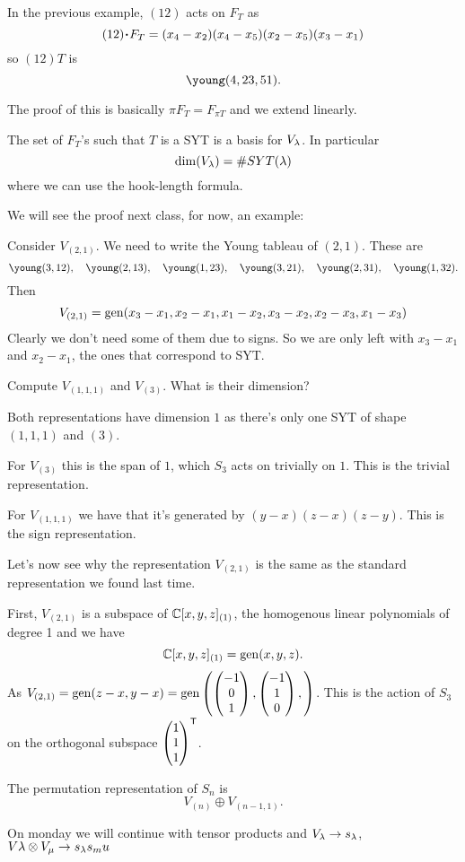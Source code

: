 \documentclass[12pt]{memoir}
\begin{document}
\begin{Ex}
    In the previous example, $(12)$ acts on $F_T$ as 
    $$(12)\.F_T=(x_4-x_2)(x_4-x_5)(x_2-x_5)(x_3-x_1)$$
    so $(12)T$ is 
    $$\young(4,23,51).$$
\end{Ex}

The proof of this is basically $\pi F_T=F_{\pi T}$ and we extend linearly. 

\begin{Prop}
    The set of $F_T$'s such that $T$ is a SYT is a basis for $V_\lambda$. In particular 
    $$\dim(V_\lambda)=\# SYT(\lambda)$$
    where we can use the hook-length formula. 
\end{Prop}

We will see the proof next class, for now, an example:

\begin{Ex}
    Consider $V_{(2,1)}$. We need to write the Young tableau of $(2,1)$. These are 
    $$\young(3,12),\quad\young(2,13),\quad\young(1,23),\quad\young(3,21),\quad\young(2,31),\quad\young(1,32).$$
    Then 
    $$V_{(2,1)}=\operatorname{gen}(x_3-x_1,x_2-x_1,x_1-x_2,x_3-x_2,x_2-x_3,x_1-x_3)$$
    Clearly we don't need some of them due to signs. So we are only left with $x_3-x_1$ and $x_2-x_1$, the ones that correspond to SYT.
\end{Ex}

\begin{Ej}
    Compute $V_{(1,1,1)}$ and $V_{(3)}$. What is their dimension? 
\end{Ej}

\begin{ptcbr}
    Both representations have dimension $1$ as there's only one SYT of shape $(1,1,1)$ and $(3)$.\par 
    For $V_{(3)}$ this is the span of $1$, which $S_3$ acts on trivially on $1$. This is the trivial representation.\par 
    For $V_{(1,1,1)}$ we have that it's generated by $(y-x)(z-x)(z-y)$. This is the sign representation.
\end{ptcbr}

Let's now see why the representation $V_{(2,1)}$ is the same as the standard representation we found last time.\par 
First, $V_{(2,1)}$ is a subspace of $\mathbb{C}[x,y,z]_{(1)}$, the homogenous linear polynomials of degree 1 and we have
$$\mathbb{C}[x,y,z]_{(1)}=\operatorname{gen}(x,y,z).$$
As $V_{(2,1)}=\operatorname{gen}(z-x,y-x)=\operatorname{gen}\left(\begin{pmatrix} -1 \\ 0 \\ 1 \end{pmatrix},\begin{pmatrix} -1 \\ 1 \\ 0 \end{pmatrix},\right)$. This is the action of $S_3$ on the orthogonal subspace $\begin{pmatrix} 1 \\ 1 \\ 1 \end{pmatrix}^{\mathsf{T}}$.

\begin{Lem}
    The permutation representation of $S_n$ is 
    $$V_{(n)}\oplus V_{(n-1,1)}.$$
\end{Lem}

On monday we will continue with tensor products and $V_\lambda\to s_\lambda$, $V\lambda\otimes V_\mu\to s_\lambda s_mu$
\ifx\nextra\undefined
\printindex
\else\fi
\nocite{*}


\end{document}
